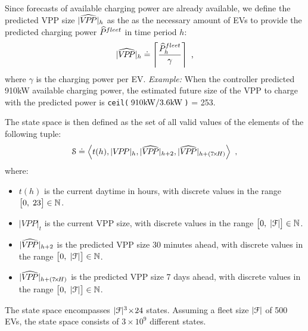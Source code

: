 \documentclass[a4paper, 12pt]{article}
\begin{document}
Since forecasts of available charging power are already available, we define the
predicted VPP size \({|\widehat{V\!P\!P}|_{h}}\) as the as the necessary amount of EVs to provide
the predicted charging power \(\widehat{P}^{fleet}_{}\) in time period \(h\):
\begin{equation}
    {|\widehat{V\!P\!P}|_{h}} \doteq \left\lceil\frac{\widehat{P}^{fleet}_{h}}{\gamma}\right\rceil \text{ ,}
\end{equation}
where \(\gamma\) is the charging power per EV. \emph{Example:} When the controller
predicted 910kW available charging power, the estimated future
size of the VPP to charge with the predicted power is  \texttt{ceil(} \(\!910\text{kW} /
3.6\text{kW}\!\) \texttt{)} = 253.


The state space is then defined as
the set of all valid values of the elements of the following tuple:
\begin{equation}
    \S \defeq \left\langle t(h), \vpp{h}, \vpphat{h+2}, \vpphat{h+(7\!\times\!H)}\right\rangle \text{ ,}
\end{equation}
where:
\begin{itemize}
\item \(t(h)\) is the current daytime in hours, with discrete values in the range
\(\big[0,\;23\big] \in \mathbb{N}\).
\item \(|VPP|_t\) is the current VPP size, with discrete values in the range
\(\big[0,\;|{\cal{F}}|\big] \in \mathbb{N}\).
\item \({|\widehat{V\!P\!P}|_{h+2}}\) is the predicted VPP size 30 minutes ahead, with discrete values in the range
\(\big[0,\;|{\cal{F}}|\big] \in \mathbb{N}\).
\item \({|\widehat{V\!P\!P}|_{h+(7\!\times\!H)}}\) is the predicted VPP size 7 days ahead, with discrete
values in the range \(\big[0,\;|{\cal{F}}|\big] \in \mathbb{N}\).
\end{itemize}
The state space encompasses \(|{\cal{F}}|^3\!\times\!24\) states. Assuming a fleet size
\(|{\cal{F}}|\) of 500 EVs, the state space consists of \(3\!\times\!10^9\) different states.
\end{document}
